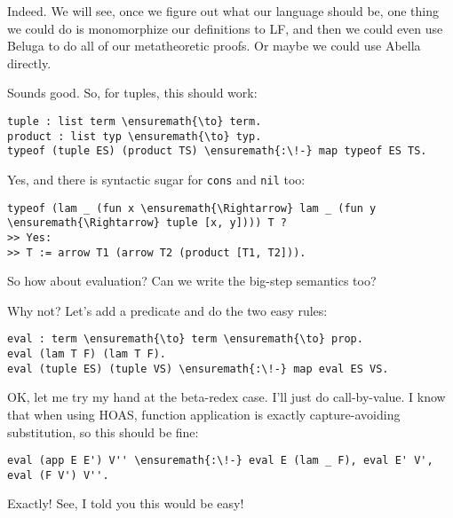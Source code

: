 \heroADVISOR{} Indeed. We will see, once we figure out what our language
should be, one thing we could do is monomorphize our definitions to LF,
and then we could even use Beluga \citep{beluga-main-reference} to do
all of our metatheoretic proofs. Or maybe we could use Abella
\citep{abella-main-reference} directly.

\heroSTUDENT{} Sounds good. So, for tuples, this should work:

\importantCodeblock{}

\begin{verbatim}
tuple : list term \ensuremath{\to} term.
product : list typ \ensuremath{\to} typ.
typeof (tuple ES) (product TS) \ensuremath{:\!-} map typeof ES TS.
\end{verbatim}

\importantCodeblockEnd{}

\heroADVISOR{} Yes, and there is syntactic sugar for \texttt{cons} and
\texttt{nil} too:

\begin{verbatim}
typeof (lam _ (fun x \ensuremath{\Rightarrow} lam _ (fun y \ensuremath{\Rightarrow} tuple [x, y]))) T ?
>> Yes:
>> T := arrow T1 (arrow T2 (product [T1, T2])).
\end{verbatim}

\heroSTUDENT{} So how about evaluation? Can we write the big-step semantics
too?

\heroADVISOR{} Why not? Let's add a predicate and do the two easy rules:

\importantCodeblock{}

\begin{verbatim}
eval : term \ensuremath{\to} term \ensuremath{\to} prop.
eval (lam T F) (lam T F).
eval (tuple ES) (tuple VS) \ensuremath{:\!-} map eval ES VS.
\end{verbatim}

\importantCodeblockEnd{}

\heroSTUDENT{} OK, let me try my hand at the beta-redex case. I'll just do
call-by-value. I know that when using HOAS, function application is
exactly capture-avoiding substitution, so this should be fine:

\importantCodeblock{}

\begin{verbatim}
eval (app E E') V'' \ensuremath{:\!-} eval E (lam _ F), eval E' V', eval (F V') V''.
\end{verbatim}

\importantCodeblockEnd{}

\heroADVISOR{} Exactly! See, I told you this would be easy!
